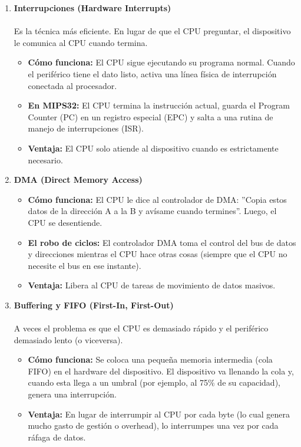 \documentclass[]{article}
\begin{document}
	\begin{enumerate}
		\item \textbf{Interrupciones (Hardware Interrupts)}\\\\
			Es la técnica más eficiente. En lugar de que el CPU preguntar, el dispositivo le comunica al CPU cuando termina.
			\begin{itemize}
				\item \textbf{Cómo funciona:} El CPU sigue ejecutando su programa normal. Cuando el periférico tiene el dato listo, activa una línea física de interrupción conectada al procesador.
				\item \textbf{En MIPS32:} El CPU termina la instrucción actual, guarda el Program Counter (PC) en un registro especial (EPC) y salta a una rutina de manejo de interrupciones (ISR).
				\item \textbf{Ventaja:} El CPU solo atiende al dispositivo cuando es estrictamente necesario.
			\end{itemize}
		\item \textbf{DMA (Direct Memory Access)}
			\begin{itemize}
				\item \textbf{Cómo funciona:} El CPU le dice al controlador de DMA: ''Copia estos datos de la dirección A a la B y avísame cuando termines''. Luego, el CPU se desentiende.
				\item \textbf{El robo de ciclos:} El controlador DMA toma el control del bus de datos y direcciones mientras el CPU hace otras cosas (siempre que el CPU no necesite el bus en ese instante).
				\item \textbf{Ventaja:} Libera al CPU de tareas de movimiento de datos masivos.
			\end{itemize}
		\item \textbf{Buffering y FIFO (First-In, First-Out)}\\\\
			A veces el problema es que el CPU es demasiado rápido y el periférico demasiado lento (o viceversa).
			\begin{itemize}
				\item \textbf{Cómo funciona:} Se coloca una pequeña memoria intermedia (cola FIFO) en el hardware del dispositivo. El dispositivo va llenando la cola y, cuando esta llega a un umbral (por ejemplo, al 75\% de su capacidad), genera una interrupción.
				\item \textbf{Ventaja:} En lugar de interrumpir al CPU por cada byte (lo cual genera mucho gasto de gestión o overhead), lo interrumpes una vez por cada ráfaga de datos.
			\end{itemize}
	\end{enumerate}
	
\end{document}
